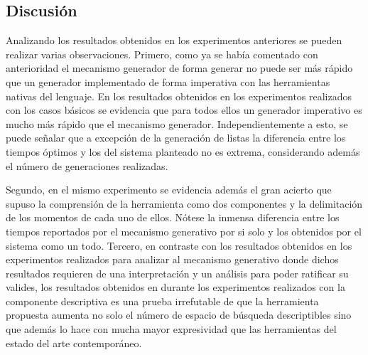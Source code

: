 \subsection{Discusión}

Analizando los resultados obtenidos en los experimentos anteriores se pueden realizar varias observaciones.
Primero, como ya se había comentado con anterioridad el mecanismo generador de forma generar no puede ser más
rápido que un generador implementado de forma imperativa con las herramientas nativas del lenguaje. En los
resultados obtenidos en los experimentos realizados con los casos básicos se evidencia que para todos ellos un generador
imperativo es mucho más rápido que el mecanismo generador. Independientemente a esto, se puede señalar que a
excepción de la generación de listas la diferencia entre los tiempos óptimos y los del sistema planteado no es
extrema, considerando además el número de generaciones realizadas.

Segundo, en el mismo experimento se evidencia además el gran acierto que supuso la comprensión de la herramienta
como dos componentes y la delimitación de los momentos de cada uno de ellos. Nótese la inmensa diferencia entre
los tiempos reportados por el mecanismo generativo por si solo y los obtenidos por el sistema como un todo. Tercero,
en contraste con los resultados obtenidos en los experimentos realizados para analizar al mecanismo generativo donde
dichos resultados requieren de una interpretación y un análisis para poder ratificar su valides, los resultados
obtenidos en durante los experimentos realizados con la componente descriptiva es una prueba irrefutable de que la
herramienta propuesta aumenta no solo el número de espacio de búsqueda descriptibles sino que además lo hace con
mucha mayor expresividad que las herramientas del estado del arte contemporáneo.

